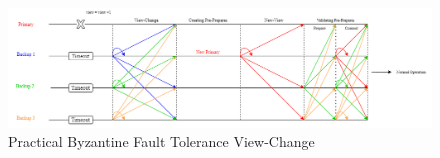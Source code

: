\begin{figure}[!h]
	\centering
	\includegraphics[width=1.1\textwidth]{figures/PBFTViewChange}
	\caption{Practical Byzantine Fault Tolerance View-Change}
	\label{fig:pbftviewchange}
\end{figure}


